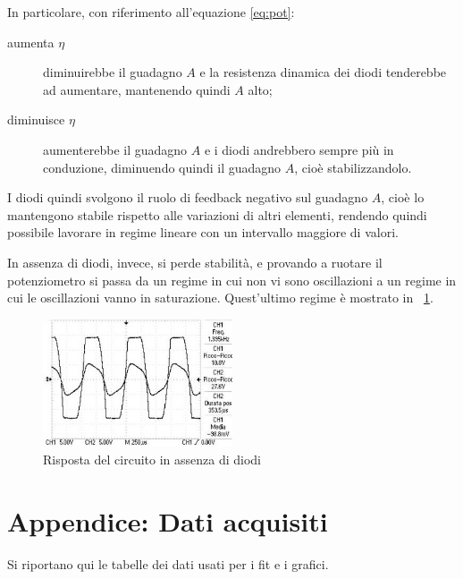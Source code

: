 \documentclass[10pt,a4paper]{article}
\begin{document}
In particolare, con riferimento all'equazione \eqref{eq:pot}:
\begin{description}
\item[aumenta $\eta$] diminuirebbe il guadagno $A$ e la resistenza dinamica dei diodi tenderebbe ad aumentare, mantenendo quindi $A$ alto;
\item[diminuisce $\eta$] aumenterebbe il guadagno $A$ e i diodi andrebbero sempre più in conduzione, diminuendo quindi il guadagno $A$, cioè stabilizzandolo.
\end{description}

I diodi quindi svolgono il ruolo di feedback negativo sul guadagno $A$, cioè lo mantengono stabile rispetto alle variazioni di altri elementi, rendendo quindi possibile lavorare in regime lineare con un intervallo maggiore di valori.

In assenza di diodi, invece, si perde stabilità, e provando a ruotare il potenziometro si passa da un regime in cui non vi sono oscillazioni a un regime in cui le oscillazioni vanno in saturazione. Quest'ultimo regime è mostrato in \figurename{~\ref{fig:wdiod}}.

\begin{figure}[H]
    	\centering
        \includegraphics[width=0.5\textwidth]{../oscilloscopio/punto5(scazzo).jpg}
    \caption{Risposta del circuito in assenza di diodi}
    \label{fig:wdiod}
\end{figure}

\pagebreak
\section{Appendice: Dati acquisiti}
Si riportano qui le tabelle dei dati usati per i fit e i grafici.

\begin{figure}[H]
	\centering
	\resizebox{0.7\textwidth}{!}{
	}
	\label{tab:loop}
\end{figure}
\end{document}
